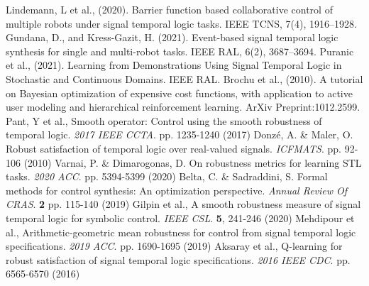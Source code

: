 \begin{thebibliography}{00}
 Lindemann, L et al., (2020). Barrier function based collaborative control of multiple robots under signal temporal logic tasks. IEEE TCNS, 7(4), 1916–1928. 
 Gundana, D., and Kress-Gazit, H. (2021). Event-based signal temporal logic synthesis for single and multi-robot tasks. IEEE RAL, 6(2), 3687–3694.
 Puranic et al., (2021). Learning from Demonstrations Using Signal Temporal Logic in Stochastic and Continuous Domains. IEEE RAL. 
 Brochu et al., (2010). A tutorial on Bayesian optimization of expensive cost functions, with application to active user modeling and hierarchical reinforcement learning. ArXiv Preprint:1012.2599. 
Pant, Y et al., Smooth operator: Control using the smooth robustness of temporal logic. {\em 2017 IEEE CCTA}. pp. 1235-1240 (2017)
Donzé, A. \& Maler, O. Robust satisfaction of temporal logic over real-valued signals. {\em ICFMATS}. pp. 92-106 (2010)
Varnai, P. \& Dimarogonas, D. On robustness metrics for learning STL tasks. {\em 2020 ACC}. pp. 5394-5399 (2020)
Belta, C. \& Sadraddini, S. Formal methods for control synthesis: An optimization perspective. {\em Annual Review Of CRAS}. \textbf{2} pp. 115-140 (2019)
Gilpin et al., A smooth robustness measure of signal temporal logic for symbolic control. {\em IEEE CSL}. \textbf{5}, 241-246 (2020)
Mehdipour et al., Arithmetic-geometric mean robustness for control from signal temporal logic specifications. {\em 2019 ACC}. pp. 1690-1695 (2019)
Aksaray et al., Q-learning for robust satisfaction of signal temporal logic specifications. {\em 2016 IEEE CDC}. pp. 6565-6570 (2016)
\end{thebibliography}